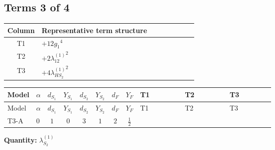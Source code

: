 \documentclass[8pt]{article}
\begin{document}
\begin{landscape}
\subsection*{Terms 3 of 4}
\begin{center}
\begin{tabular}{@{}c >{\raggedright\arraybackslash}p{0.82\linewidth}@{}}
\toprule
Column & Representative term structure \\
\midrule
T1 & \(\displaystyle +12 {g_1}^4\) \\
\midrule
T2 & \(\displaystyle +2 {\lambda_{12}^{(1)}}^2\) \\
\midrule
T3 & \(\displaystyle +4 {\lambda_{HS_2}^{(1)}}^2\) \\
\midrule
\bottomrule
\end{tabular}
\end{center}
\smallskip
\tiny
\begin{longtable}{@{}llcccccc >{\raggedright\arraybackslash}p{0.21\linewidth} >{\raggedright\arraybackslash}p{0.21\linewidth} >{\raggedright\arraybackslash}p{0.21\linewidth}@{}}
\toprule
Model & $\alpha$ & $d_{S_1}$ & $Y_{S_1}$ & $d_{S_2}$ & $Y_{S_2}$ & $d_F$ & $Y_F$ & T1 & T2 & T3 \\
\midrule
\endfirsthead
\toprule
Model & $\alpha$ & $d_{S_1}$ & $Y_{S_1}$ & $d_{S_2}$ & $Y_{S_2}$ & $d_F$ & $Y_F$ & T1 & T2 & T3 \\
\midrule
\endhead
T3-A & $0$ & $1$ & $0$ & $3$ & $1$ & $2$ & $\frac{1}{2}$ & \scriptsize\adjustbox{max width=\linewidth}{$\begin{gathered} +12 {g_1}^4\end{gathered}$} & \scriptsize\adjustbox{max width=\linewidth}{$\begin{gathered} +2 {\lambda_{12}^{(1)}}^2\end{gathered}$} & \scriptsize\adjustbox{max width=\linewidth}{$\begin{gathered} +4 {\lambda_{HS_2}^{(1)}}^2\end{gathered}$} \\
\midrule
\bottomrule
\end{longtable}
\clearpage
\noindent\textbf{Quantity: }$\lambda_{S_2}^{(1)}$\par\smallskip

\end{landscape}
\end{document}
